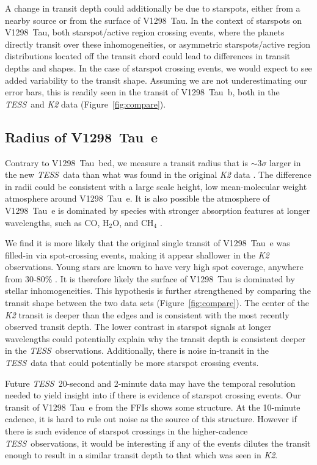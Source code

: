 \documentclass[twocolumn]{aastex631}
\newcommand{\tess}{\textit{TESS}}
\newcommand{\sname}{V1298~Tau\xspace}
\newcommand{\planetb}{V1298~Tau~b\xspace}
\newcommand{\planete}{V1298~Tau~e\xspace}
\newcommand{\planetknown}{V1298~Tau~bcd\xspace}
\begin{document}
A change in transit depth could additionally be due to starspots, either from a nearby source or from the surface of \sname. In the context of starspots on \sname, both starspot/active region crossing events, where the planets directly transit over these inhomogeneities, or asymmetric starspots/active region distributions located off the transit chord could lead to differences in transit depths and shapes. In the case of starspot crossing events, we would expect to see added variability to the transit shape. Assuming we are not underestimating our error bars, this is readily seen in the transit of \planetb, both in the \tess\ and \textit{K2} data (Figure~\ref{fig:compare}). 


\subsection{Radius of \planete}

Contrary to \planetknown, we measure a transit radius that is $\sim 3\sigma$ larger in the new \tess\ data than what was found in the original \textit{K2} data \citep{David2019a}. The difference in radii could be consistent with a large scale height, low mean-molecular weight atmosphere around \planete \citep{deMooij12}. It is also possible the atmosphere of \planete is dominated by species with stronger absorption features at longer wavelengths, such as CO, H$_2$O, and CH$_4$ \citep{carter09}. 

We find it is more likely that the original single transit of \planete was filled-in via spot-crossing events, making it appear shallower in the \textit{K2} observations. Young stars are known to have very high spot coverage, anywhere from 30-80\% \citep[][]{grankin99, gully17, feinstein20}. It is therefore likely the surface of \sname is dominated by stellar inhomogeneities. This hypothesis is further strengthened by comparing the transit shape between the two data sets (Figure~\ref{fig:compare}). The center of the \textit{K2} transit is deeper than the edges and is consistent with the most recently observed transit depth. The lower contrast in starspot signals at longer wavelengths could potentially explain why the transit depth is consistent deeper in the \tess\ observations. Additionally, there is noise in-transit in the \tess\ data that could potentially be more starspot crossing events.


Future \tess\ 20-second and 2-minute data may have the temporal resolution needed to yield insight into if there is evidence of starspot crossing events. Our transit of \planete from the FFIs shows some structure. At the 10-minute cadence, it is hard to rule out noise as the source of this structure. However if there is such evidence of starspot crossings in the higher-cadence \tess\ observations, it would be interesting if any of the events dilutes the transit enough to result in a similar transit depth to that which was seen in \textit{K2}. 
\end{document}
